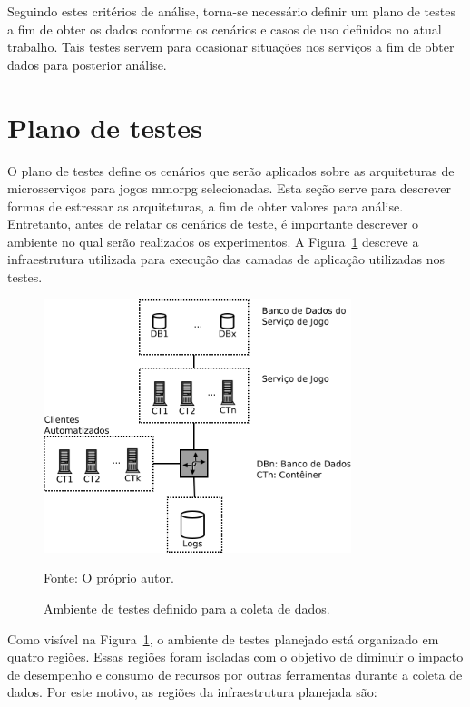 Seguindo estes critérios de análise, torna-se necessário definir um plano de testes a fim de obter os dados conforme os cenários e casos de uso definidos no atual trabalho.
%
Tais testes servem para ocasionar situações nos serviços a fim de obter dados para posterior análise.



\section {Plano de testes}
\label{sec:plano}



O plano de testes define os cenários que serão aplicados sobre as arquiteturas de microsserviços para jogos \ac{mmorpg} selecionadas.
%
Esta seção serve para descrever formas de estressar as arquiteturas, a fim de obter valores para análise.
%
Entretanto, antes de relatar os cenários de teste, é importante descrever o ambiente no qual serão realizados os experimentos.
%
A Figura~\ref{Ambiente de testes} descreve a infraestrutura utilizada para execução das camadas de aplicação utilizadas nos testes.



\begin{figure}[htb!]
  \caption{Ambiente de testes definido para a coleta de dados.}
  \label{Ambiente de testes}
  \includegraphics[width=0.8\textwidth]{img/cap3/infraestrutura.png}
  \centering

  Fonte: O próprio autor.
\end{figure}



Como visível na Figura~\ref{Ambiente de testes}, o ambiente de testes planejado está organizado em quatro regiões.
%
Essas regiões foram isoladas com o objetivo de diminuir o impacto de desempenho e consumo de recursos por outras ferramentas durante a coleta de dados.
%
Por este motivo, as regiões da infraestrutura planejada são:



